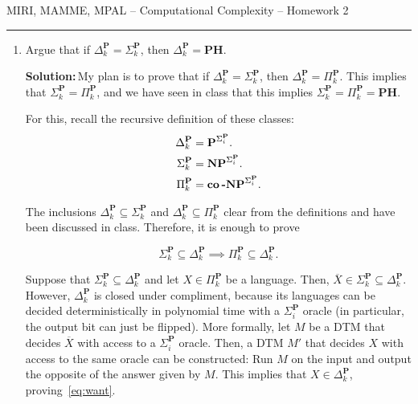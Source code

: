 \documentclass{amsart}
\theoremstyle{plain}
\theoremstyle{definition}
\newcommand{\np}{\textbf{NP}}
\newcommand{\p}{\textbf{P}}
\newcommand{\conp}{\textbf{co\,-NP}}
\newcommand{\ph}{\textbf{PH}}
\newcommand{\sol}{\textbf{Solution:\,}}
\newcommand{\ov}[1]{\overline{#1}}
\begin{document}
    {\Large MIRI, MAMME, MPAL -- Computational Complexity -- Homework 2}

    \vspace{0.5cm}

    \hrule

    \vspace{0.5cm}

    \begin{enumerate}[label=\textbf{Exercise \arabic*:}, leftmargin=0cm, labelwidth=-0.2cm, align=left]

        \item
            Argue that if $\Delta_k^\p = \Sigma_k^\p$, then $\Delta_k^\p=$\ph\@.

            \sol My plan is to prove that if $\Delta_k^\p = \Sigma_k^\p$, then $\Delta_k^\p=\Pi_k^\p$.
            This implies that $\Sigma_k^\p = \Pi_k^\p$, and we have seen in class that
            this implies $\Sigma_k^\p = \Pi_k^\p = \ph$.

            For this, recall the recursive definition of these classes:
            \begin{align*}
                \Delta_k^\p &= \p^{\Sigma_i^\p}. \\
                \Sigma_k^\p &= \np^{\Sigma_i^\p}. \\
                \Pi_k^\p &= \conp^{\Sigma_i^\p}.
            \end{align*}

            The inclusions $\Delta_k^\p \subseteq \Sigma_k^\p$ and $\Delta_k^\p \subseteq \Pi_k^\p$ clear
            from the definitions and have been discussed in class.
            Therefore, it is enough to prove

            \begin{equation}
                \Sigma_k^\p \subseteq \Delta_k^\p \implies \Pi_k^\p \subseteq \Delta_k^\p.\label{eq:want}
            \end{equation}

            Suppose that $\Sigma_k^\p \subseteq \Delta_k^\p$ and let $X \in \Pi_k^\p$ be a language.
            Then, $\ov{X} \in \Sigma_k^\p \subseteq \Delta_k^\p$.
            However, $\Delta_k^\p$ is closed under compliment, because its languages can be decided
            deterministically in polynomial time with a $\Sigma_i^\p$ oracle
            (in particular, the output bit can just be flipped).
            More formally, let $M$ be a DTM that decides $\ov{X}$ with access to a $\Sigma_i^\p$ oracle.
            Then, a DTM $M'$ that decides $X$ with access to the same oracle can be constructed:
            Run $M$ on the input and output the opposite of the answer given by $M$.
            This implies that $X \in \Delta_k^\p$, proving~\eqref{eq:want}.




    \end{enumerate}
\end{document}
